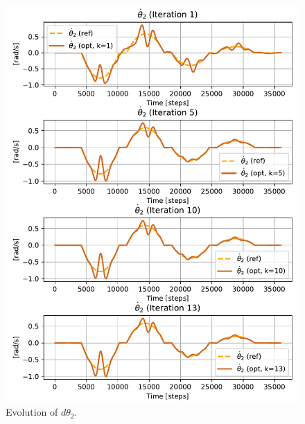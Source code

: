 \begin{figure}[htb]
    \includegraphics[width=1\linewidth]{img/2-task2/th2dot_evolution.pdf}
    \caption{Evolution of $d\theta_2$.}
    \label{fig:dtheta2-evolution}
\end{figure}

